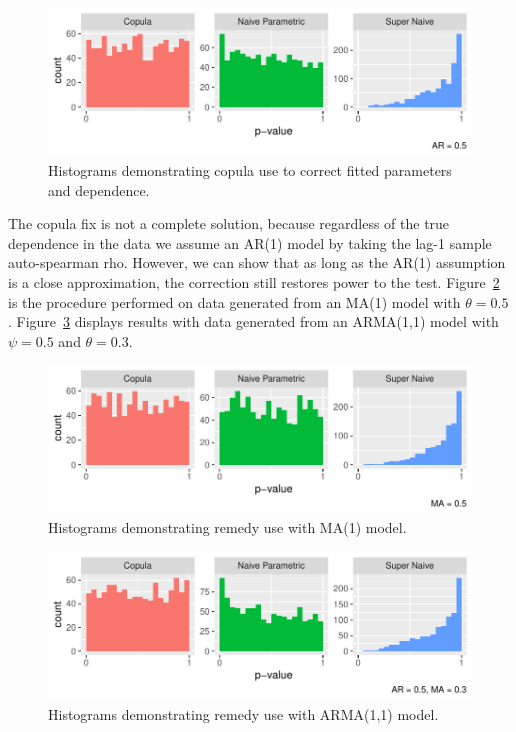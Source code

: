 \documentclass[12pt, letterpaper, titlepage]{article}
\begin{document}
\begin{figure}[tbp]
  \centering
  \includegraphics{hist_copula}
  \caption{Histograms demonstrating copula use to correct fitted parameters and dependence.}
  \label{fig:hist_copula}
\end{figure}

The copula fix is not a complete solution, because regardless of the true dependence in the data
we assume an AR(1) model by taking the lag-1 sample auto-spearman rho. However, we can 
show that as long as the AR(1) assumption is a close approximation, the correction still restores power to the test.
Figure~\ref{fig:hist_copula_ma1} is the procedure performed on data generated from 
an MA(1) model with $\theta = 0.5$. Figure~\ref{fig:hist_copula_arma} displays results with 
data generated from an ARMA(1,1) model with $\psi = 0.5$ and $\theta = 0.3$. 

\begin{figure}[tbp]
  \centering
  \includegraphics{hist_copula_ma1}
  \caption{Histograms demonstrating remedy use with MA(1) model.}
  \label{fig:hist_copula_ma1}
\end{figure}

\begin{figure}[tbp]
  \centering
  \includegraphics{hist_copula_arma}
  \caption{Histograms demonstrating remedy use with ARMA(1,1) model.}
  \label{fig:hist_copula_arma}
\end{figure}
\end{document}
